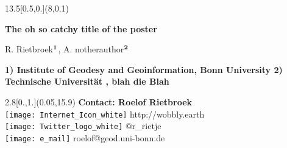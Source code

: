 \documentclass[landscape,a0,final]{a0poster}
\makeatletter
\newcommand{\ititle}{The oh so catchy title of the poster}
\newcommand{\iauthor}{Roelof Rietbroek}
\newcommand{\iemail}{roelof@geod.uni-bonn.de}
\newcommand{\itweet}{@r\_rietje}
\newcommand{\iblog}{http://wobbly.earth}
\makeatother
\begin{document}




\begin{textblock}{13.5}[0.5,0.](8,0.1)
\begin{center}
{
    {\Huge \color{white} \sffamily \textbf{\ititle}\\[0.7cm]}

    {\color{unigrau} \huge \sffamily
R. Rietbroek$^{\footnotesize\textbf{1}}$,
    A. notherauthor$^{\footnotesize\textbf{2}}$}\\[0.5cm]}

    {\color{unigrau} \large \sffamily \textbf{1) Institute of Geodesy and
    Geoinformation, Bonn University 
    2) Technische Universit\"at , blah die Blah\\}}

\end{center}
\end{textblock}





\begin{textblock}{2.8}[0.,1.](0.05,15.9)
{\large \sffamily \color{white}
  \noindent \textbf{Contact: \iauthor}\\
\texttt{[image: Internet\_Icon\_white]} \iblog\\
\texttt{[image: Twitter\_logo\_white]} \itweet\\ 
\texttt{[image: e\_mail]} \iemail
}\end{textblock}
\end{document}
